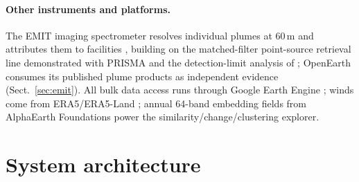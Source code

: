 \documentclass[11pt]{article}
\begin{document}
\paragraph{Other instruments and platforms.}
The EMIT imaging spectrometer \citep{green2020} resolves individual plumes
at 60\,m and attributes them to facilities \citep{thorpe2023}, building on
the matched-filter point-source retrieval line demonstrated with PRISMA
\citep{guanter2021} and the detection-limit analysis of
\citet{cusworth2019}; OpenEarth consumes its published plume products as
independent evidence (Sect.~\ref{sec:emit}). All bulk data access runs through Google Earth
Engine \citep{gorelick2017}; winds come from ERA5/ERA5-Land
\citep{hersbach2020,munozsabater2021}; annual 64-band embedding fields
from AlphaEarth Foundations \citep{brown2025alphaearth} power the
similarity/change/clustering explorer.

\section{System architecture}\label{sec:system}
\end{document}
